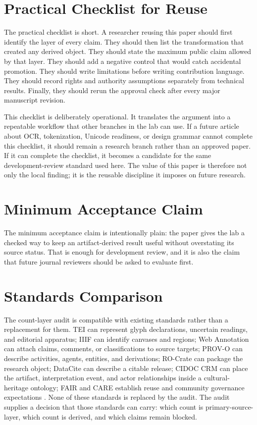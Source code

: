\documentclass[sigconf,nonacm]{acmart}
\begin{document}
\section{Practical Checklist for Reuse}
The practical checklist is short. A researcher reusing this paper should first
identify the layer of every claim. They should then list the transformation that
created any derived object. They should state the maximum public claim allowed
by that layer. They should add a negative control that would catch accidental
promotion. They should write limitations before writing contribution language.
They should record rights and authority assumptions separately from technical
results. Finally, they should rerun the approval check after every major
manuscript revision.

This checklist is deliberately operational. It translates the argument into a
repeatable workflow that other branches in the lab can use. If a future article
about OCR, tokenization, Unicode readiness, or design grammar cannot complete
this checklist, it should remain a research branch rather than an approved
paper. If it can complete the checklist, it becomes a candidate for the same
development-review standard used here. The value of this paper is therefore not
only the local finding; it is the reusable discipline it imposes on future
research.

\section{Minimum Acceptance Claim}
The minimum acceptance claim is intentionally plain: the paper gives the lab a
checked way to keep an artifact-derived result useful without overstating its
source status. That is enough for development review, and it is also the claim
that future journal reviewers should be asked to evaluate first.



\section{Standards Comparison}
The count-layer audit is compatible with existing standards rather than a
replacement for them. TEI can represent glyph declarations, uncertain readings,
and editorial apparatus; IIIF can identify canvases and regions; Web Annotation
can attach claims, comments, or classifications to source targets; PROV-O can
describe activities, agents, entities, and derivations; RO-Crate can package the
research object; DataCite can describe a citable release; CIDOC CRM can place
the artifact, interpretation event, and actor relationships inside a
cultural-heritage ontology; FAIR and CARE establish reuse and community
governance expectations \cite{azuonye1992,omniglotNwagu,unicodeAfricanScripts2023,scriptSourceNwagu,sirisNwaguProposal,teiP5Glyphs,iiifPresentation3,w3cAnnotationModel,w3cAnnotationVocab,w3cProvO,rocrate12,cidocCrm,datacite45,wilkinson2016fair,carroll2020care,wadden2020scifact,gao2023alce,karpathyAutoresearch,acmSubmissions,arxivSubmitTex}. None of these standards is
replaced by the audit. The audit supplies a decision that those standards can
carry: which count is primary-source-layer, which count is derived, and which
claims remain blocked.
\end{document}
